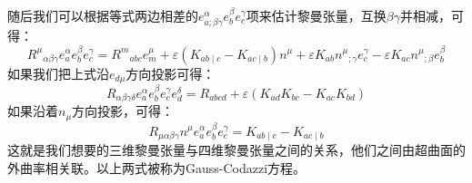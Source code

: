 \documentclass[hyperref, UTF8, a4paper]{ctexart}
\begin{document}
随后我们可以根据等式两边相差的$e_{a;\beta \gamma }^{\alpha } e_{b}^{\beta } e_{c}^{\gamma }$项来估计黎曼张量，互换$\beta \gamma $并相减，可得：
\begin{equation*}
	R^{\mu }{}_{\alpha \beta \gamma } e_{a}^{\alpha } e_{b}^{\beta } e_{c}^{\gamma } =R^{m}{}_{abc} e_{m}^{\mu } +\varepsilon ( K_{ab\mid c} -K_{ac\mid b}) n^{\mu } +\varepsilon K_{ab} n^{\mu }{}_{;\gamma } e_{c}^{\gamma } -\varepsilon K_{ac} n^{\mu }{}_{;\beta } e_{b}^{\beta }
\end{equation*}
如果我们把上式沿$e_{d\mu }$方向投影可得：
\begin{equation*}
	\boxed{R_{\alpha \beta \gamma \delta } e_{a}^{\alpha } e_{b}^{\beta } e_{c}^{\gamma } e_{d}^{\delta } =R_{abcd} +\varepsilon ( K_{ad} K_{bc} -K_{ac} K_{bd})}
\end{equation*}
如果沿着$n_{\mu }$方向投影，可得：
\begin{equation*}
	\boxed{R_{\mu \alpha \beta \gamma } n^{\mu } e_{a}^{\alpha } e_{b}^{\beta } e_{c}^{\gamma } =K_{ab\mid c} -K_{ac\mid b}}
\end{equation*}
这就是我们想要的三维黎曼张量与四维黎曼张量之间的关系，他们之间由超曲面的外曲率相关联。以上两式被称为Gauss-Codazzi方程。
\end{document}
